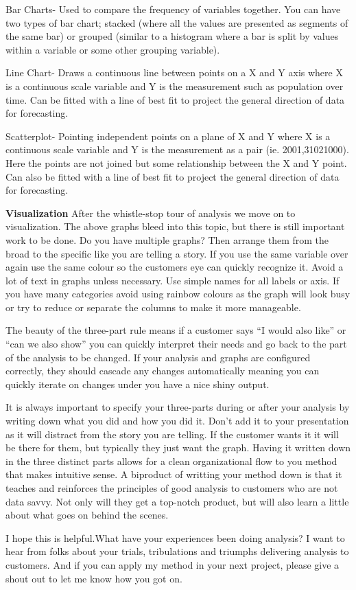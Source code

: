 \documentclass[]{article}
\begin{document}
Bar Charts- Used to compare the frequency of variables together. You can
have two types of bar chart; stacked (where all the values are presented
as segments of the same bar) or grouped (similar to a histogram where a
bar is split by values within a variable or some other grouping
variable).

Line Chart- Draws a continuous line between points on a X and Y axis
where X is a continuous scale variable and Y is the measurement such as
population over time. Can be fitted with a line of best fit to project
the general direction of data for forecasting.

Scatterplot- Pointing independent points on a plane of X and Y where X
is a continuous scale variable and Y is the measurement as a pair (ie.
2001,31021000). Here the points are not joined but some relationship
between the X and Y point. Can also be fitted with a line of best fit to
project the general direction of data for forecasting.

\textbf{Visualization} After the whistle-stop tour of analysis we move
on to visualization. The above graphs bleed into this topic, but there
is still important work to be done. Do you have multiple graphs? Then
arrange them from the broad to the specific like you are telling a
story. If you use the same variable over again use the same colour so
the customers eye can quickly recognize it. Avoid a lot of text in
graphs unless necessary. Use simple names for all labels or axis. If you
have many categories avoid using rainbow colours as the graph will look
busy or try to reduce or separate the columns to make it more
manageable.

The beauty of the three-part rule means if a customer says ``I would
also like'' or ``can we also show'' you can quickly interpret their
needs and go back to the part of the analysis to be changed. If your
analysis and graphs are configured correctly, they should cascade any
changes automatically meaning you can quickly iterate on changes under
you have a nice shiny output.

It is always important to specify your three-parts during or after your
analysis by writing down what you did and how you did it. Don't add it
to your presentation as it will distract from the story you are telling.
If the customer wants it it will be there for them, but typically they
just want the graph. Having it written down in the three distinct parts
allows for a clean organizational flow to you method that makes
intuitive sense. A biproduct of writting your method down is that it
teaches and reinforces the principles of good analysis to customers who
are not data savvy. Not only will they get a top-notch product, but will
also learn a little about what goes on behind the scenes.

I hope this is helpful.What have your experiences been doing analysis? I
want to hear from folks about your trials, tribulations and triumphs
delivering analysis to customers. And if you can apply my method in your
next project, please give a shout out to let me know how you got on.
\end{document}
